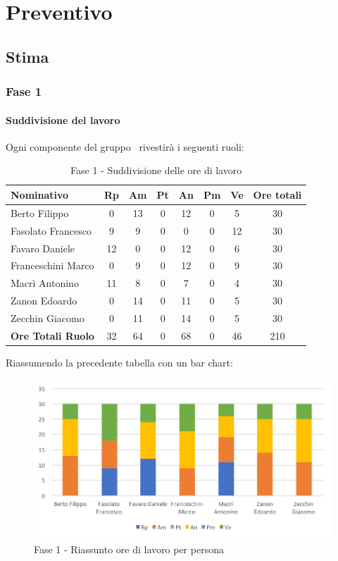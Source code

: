 \documentclass[../PianoDiProgetto.tex]{subfiles}
\begin{document}
\section{Preventivo}
	\subsection{Stima}
		\subsubsection{Fase 1}
			\paragraph{Suddivisione del lavoro}
			Ogni componente del gruppo \kpanic\ rivestirà i seguenti ruoli:
			\begin{table}[h]
				\begin{tabularx}{\textwidth}{l * {6}{C} c}
				\toprule
				\textbf{Nominativo} & \textbf{Rp} & \textbf{Am} & \textbf{Pt} & \textbf{An} & \textbf{Pm} & \textbf{Ve} & \textbf{Ore totali} \\
				\midrule
				Berto Filippo &	0 & 13 & 0 & 12 & 0 & 5 & 30 \\
				Fasolato Francesco & 9 & 9 & 0 & 0 & 0 & 12 & 30 \\
				Favaro Daniele & 12 & 0 & 0 & 12 & 0 & 6 & 30 \\
				Franceschini Marco & 0 & 9 & 0 & 12 & 0 & 9 & 30 \\
				Macrì Antonino & 11 & 8 & 0 & 7 & 0 & 4 & 30 \\
				Zanon Edoardo &	0 & 14 & 0 & 11 & 0 & 5 & 30 \\
				Zecchin Giacomo & 0 & 11 & 0 & 14 & 0 & 5 & 30 \\
				\midrule			
				\textbf{Ore Totali Ruolo} & 32 & 64 & 0 & 68 & 0 & 46 & 210 \\
				\bottomrule
				\end{tabularx}
				\caption{Fase 1 - Suddivisione delle ore di lavoro}		
			\end{table}

			Riassumendo la precedente tabella con un bar chart:	
			\begin{figure}[!h]
				\centering
				\includegraphics[width=\textwidth]{Preventivo/Immagini/fase1_oreRuoloPersona.png}
				\caption{Fase 1 - Riassunto ore di lavoro per persona}
			\end{figure}	
			
\end{document}
